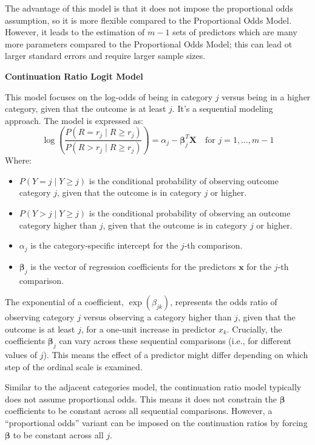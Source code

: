 \documentclass[
  letterpaper,
  DIV=11,
  numbers=noendperiod]{scrartcl}
\providecommand{\tightlist}{%
  \setlength{\itemsep}{0pt}\setlength{\parskip}{0pt}}\usepackage{longtable,booktabs,array}
\begin{document}
The advantage of this model is that it does not impose the proportional
odds assumption, so it is more flexible compared to the Proportional
Odds Model. However, it leads to the estimation of \(m-1\) sets of
predictors which are many more parameters compared to the Proportional
Odds Model; this can lead ot larger standard errors and require larger
sample sizes.

\textbf{Continuation Ratio Logit Model}

This model focuses on the log-odds of being in category \(j\) versus
being in a higher category, given that the outcome is at least \(j\).
It's a sequential modeling approach. The model is expressed as: \[ 
\log\left(\frac{P(R = r_j \mid R \ge r_j)}{P(R > r_j \mid R \ge r_j)}\right) = \alpha_j - \boldsymbol{\beta}_j^T \mathbf{X} \quad \text{for } j=1, \dots, m-1 
\] Where:

\begin{itemize}
\tightlist
\item
  \(P(Y = j \mid Y \ge j)\) is the conditional probability of observing
  outcome category \(j\), given that the outcome is in category \(j\) or
  higher.
\item
  \(P(Y > j \mid Y \ge j)\) is the conditional probability of observing
  an outcome category higher than \(j\), given that the outcome is in
  category \(j\) or higher.
\item
  \(\alpha_j\) is the category-specific intercept for the \(j\)-th
  comparison.
\item
  \(\boldsymbol{\beta}_j\) is the vector of regression coefficients for
  the predictors \(\mathbf{x}\) for the \(j\)-th comparison.
\end{itemize}

The exponential of a coefficient, \(\exp(\beta_{jk})\), represents the
odds ratio of observing category \(j\) versus observing a category
higher than \(j\), given that the outcome is at least \(j\), for a
one-unit increase in predictor \(x_k\). Crucially, the coefficients
\(\boldsymbol{\beta}_j\) can vary across these sequential comparisons
(i.e., for different values of \(j\)). This means the effect of a
predictor might differ depending on which step of the ordinal scale is
examined.

Similar to the adjacent categories model, the continuation ratio model
typically does not assume proportional odds. This means it does not
constrain the \(\boldsymbol{\beta}\) coefficients to be constant across
all sequential comparisons. However, a ``proportional odds'' variant can
be imposed on the continuation ratios by forcing \(\boldsymbol{\beta}\)
to be constant across all \(j\).
\end{document}

